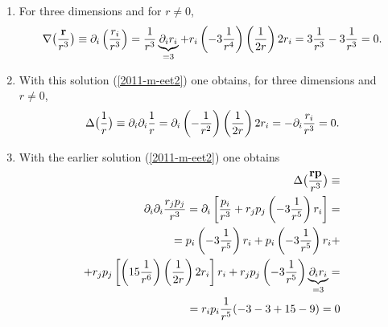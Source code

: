 {\begin{enumerate}
\item
For three dimensions and for $r \neq 0$,
\begin{equation}
\nabla \bigl({{\bf r} \over r^3} \bigr)\equiv
  \partial_i\left(\frac{r_i}{r^3}\right)=
  \frac{1}{r^3}\underbrace{\partial_i r_i}_{=3}+
  r_i\left(-3\frac{1}{r^4}\right)\left(\frac{1}{2r}\right)2r_i=
  3\frac{1}{r^3}-3\frac{1}{r^3}=0 .
\label{2011-m-eet2}
\end{equation}


\item  With this solution (\ref{2011-m-eet2}) one obtains, for three dimensions and $r \neq 0$,
\begin{equation}
\Delta \bigl({1 \over r} \bigr)\equiv
  \partial_i\partial_i\frac{1}{r}=\partial_i\left(-\frac{1}{r^2}\right)
  \left(\frac{1}{2r}\right)2r_i=-\partial_i\frac{r_i}{r^3}=0   .
\end{equation}


\item  With the earlier solution (\ref{2011-m-eet2}) one obtains
\begin{equation}
\begin{split}
\Delta \bigl({{\bf r} {\bf p} \over r^3} \bigr)\equiv \\
  \partial_i\partial_i\frac{r_jp_j}{r^3}=
    \partial_i
    \left[
      \frac{p_i}{r^3}+r_jp_j\left(-3\frac{1}{r^5}\right)r_i
    \right]= \\
  = p_i\left(-3\frac{1}{r^5}\right)r_i+
    p_i\left(-3\frac{1}{r^5}\right)r_i+ \\
   +r_jp_j
    \left[
      \left(15\frac{1}{r^6}\right)
      \left(\frac{1}{2r}\right)2r_i
    \right]r_i+
    r_jp_j\left(-3\frac{1}{r^5}\right)
    \underbrace{\partial_i r_i}_{=3}= \\
  = r_i p_i \frac{1}{r^5}(-3-3+15-9)=0
\end{split}
\end{equation}




\end{enumerate}}
